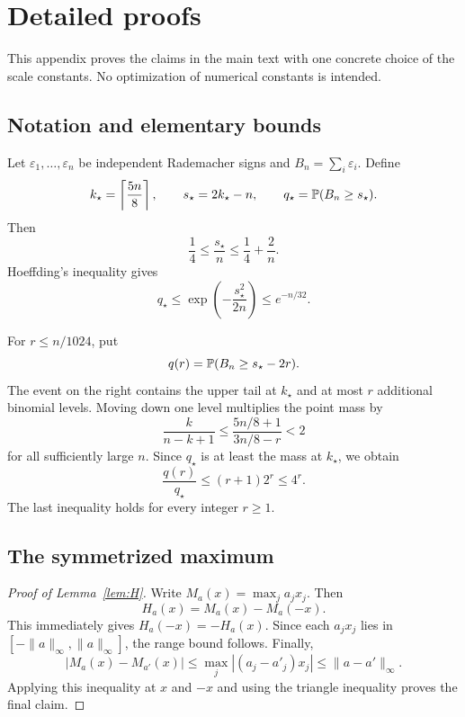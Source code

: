 \section{Detailed proofs}\label{app:proofs}

This appendix proves the claims in the main text with one concrete choice of the scale constants.
No optimization of numerical constants is intended.

\subsection{Notation and elementary bounds}

Let $\varepsilon_1,\ldots,\varepsilon_n$ be independent Rademacher signs and
$B_n=\sum_i\varepsilon_i$. Define
\[
 k_\star=\left\lceil\frac{5n}{8}\right\rceil,
 \qquad
 s_\star=2k_\star-n,
 \qquad
 q_\star=\mathbb P(B_n\ge s_\star).
\]
Then
\begin{equation}
 \frac14\le\frac{s_\star}{n}\le\frac14+\frac2n.
 \label{eq:rho-range}
\end{equation}
Hoeffding's inequality gives
\begin{equation}
 q_\star\le \exp\!\left(-\frac{s_\star^2}{2n}\right)
 \le e^{-n/32}.
 \label{eq:qstar-hoeffding}
\end{equation}

For $r\le n/1024$, put
\[
 q(r)=\mathbb P(B_n\ge s_\star-2r).
\]
The event on the right contains the upper tail at $k_\star$ and at most $r$ additional binomial
levels. Moving down one level multiplies the point mass by
\[
 \frac{k}{n-k+1}
 \le \frac{5n/8+1}{3n/8-r}
 <2
\]
for all sufficiently large $n$. Since $q_\star$ is at least the mass at $k_\star$, we obtain
\begin{equation}
 \frac{q(r)}{q_\star}
 \le(r+1)2^r\le4^r.
 \label{eq:tail-ratio}
\end{equation}
The last inequality holds for every integer $r\ge1$.

\subsection{The symmetrized maximum}

\begin{proof}[Proof of Lemma~\ref{lem:H}]
Write $M_a(x)=\max_ja_jx_j$. Then
\[
 H_a(x)=M_a(x)-M_a(-x).
\]
This immediately gives $H_a(-x)=-H_a(x)$. Since each $a_jx_j$ lies in
$[-\|a\|_\infty,\|a\|_\infty]$, the range bound follows. Finally,
\[
 |M_a(x)-M_{a'}(x)|\le\max_j|(a_j-a'_j)x_j|
 \le\|a-a'\|_\infty.
\]
Applying this inequality at $x$ and $-x$ and using the triangle inequality proves the final claim.
\end{proof}

